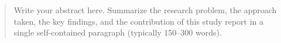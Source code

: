 \begin{abstract}
\thispagestyle{plain}

Write your abstract here. Summarize the research problem, the approach
taken, the key findings, and the contribution of this study report in a
single self-contained paragraph (typically 150--300 words).

\end{abstract}
